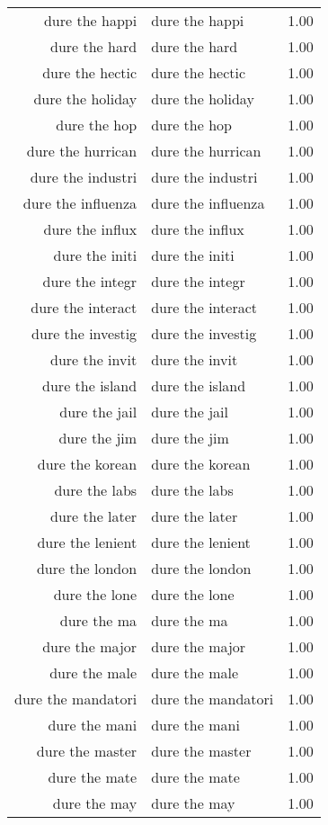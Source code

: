 \begin{table}[ht]
\begin{tabular}{rlr}
  dure the happi & dure the happi & 1.00 \\ 
  dure the hard & dure the hard & 1.00 \\ 
  dure the hectic & dure the hectic & 1.00 \\ 
  dure the holiday & dure the holiday & 1.00 \\ 
  dure the hop & dure the hop & 1.00 \\ 
  dure the hurrican & dure the hurrican & 1.00 \\ 
  dure the industri & dure the industri & 1.00 \\ 
  dure the influenza & dure the influenza & 1.00 \\ 
  dure the influx & dure the influx & 1.00 \\ 
  dure the initi & dure the initi & 1.00 \\ 
  dure the integr & dure the integr & 1.00 \\ 
  dure the interact & dure the interact & 1.00 \\ 
  dure the investig & dure the investig & 1.00 \\ 
  dure the invit & dure the invit & 1.00 \\ 
  dure the island & dure the island & 1.00 \\ 
  dure the jail & dure the jail & 1.00 \\ 
  dure the jim & dure the jim & 1.00 \\ 
  dure the korean & dure the korean & 1.00 \\ 
  dure the labs & dure the labs & 1.00 \\ 
  dure the later & dure the later & 1.00 \\ 
  dure the lenient & dure the lenient & 1.00 \\ 
  dure the london & dure the london & 1.00 \\ 
  dure the lone & dure the lone & 1.00 \\ 
  dure the ma & dure the ma & 1.00 \\ 
  dure the major & dure the major & 1.00 \\ 
  dure the male & dure the male & 1.00 \\ 
  dure the mandatori & dure the mandatori & 1.00 \\ 
  dure the mani & dure the mani & 1.00 \\ 
  dure the master & dure the master & 1.00 \\ 
  dure the mate & dure the mate & 1.00 \\ 
  dure the may & dure the may & 1.00 \\ 

\end{tabular}
\end{table}
